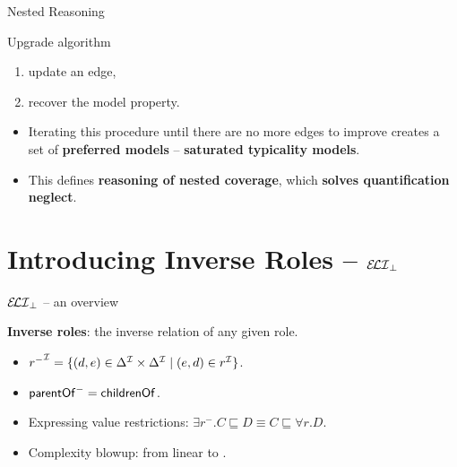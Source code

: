 \documentclass[10pt]{beamer}
\begin{document}
%
%

\begin{frame}{Nested Reasoning}
  
  Upgrade algorithm
  \begin{enumerate}
    \item update an edge,
    \item recover the model property.
  \end{enumerate}

  \vspace{3mm}

  \begin{itemize}
    \item Iterating this procedure until there are no more edges to improve creates a set of \textbf{preferred models} -- \textbf{saturated typicality models}. \pause
    \item This defines \textbf{reasoning of nested coverage}, which \textbf{solves quantification neglect}.
  \end{itemize}

\end{frame}


\section{Introducing Inverse Roles -- $\mathcal{E\!LI}_\bot$}


\begin{frame}{$\mathcal{E\!LI}_\bot$ -- an overview}
 
  \large{
  \textbf{Inverse roles}: the inverse relation of any given role.
 
  \begin{itemize}
    \item ${r^{-}}^{\mathcal{I}} = \{(d,e) \in \Delta^{\mathcal{I}} \times \Delta^{\mathcal{I}} \mid (e,d) \in r^{\mathcal{I}}\}$.
    \item ${\mathsf{parentOf}}^{-} = \mathsf{childrenOf}$.
    \item Expressing value restrictions: $\exists r^{-}.C \sqsubseteq D \equiv C \sqsubseteq \forall r.D$.
    \item Complexity blowup: from linear to \ExpTime.
  \end{itemize}
  }
\end{frame}

%
%
\end{document}
